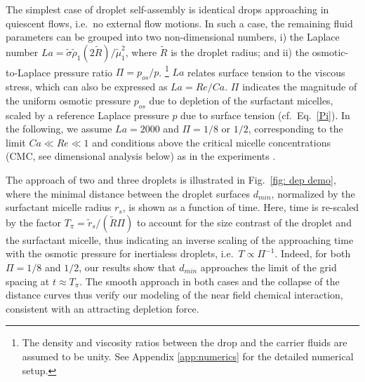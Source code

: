 The simplest case of droplet self-assembly is identical drops approaching in quiescent flows, i.e.\ no external flow motions. In such a case, the remaining fluid parameters can be grouped into two non-dimensional numbers, i) the Laplace number $La = \tilde{\sigma} \tilde{\rho}_1 (2\tilde{R})/\tilde{\mu}_1^2$, where $\tilde{R}$ is the droplet radius; and ii) the osmotic-to-Laplace pressure ratio $\Pi=p_{os}/p$. \footnote[3]{The density and viscosity ratios between the drop and the carrier fluids are assumed to be unity. See Appendix \ref{app:numerics} for the detailed numerical setup.} $La$ relates surface tension to the viscous stress, which can also be expressed as $La = Re/Ca$. $\Pi$ indicates the magnitude of the uniform osmotic pressure $p_{os}$ due to depletion of the surfactant micelles, scaled by a reference Laplace pressure $p$ due to surface tension (cf.\ Eq.\ \eqref{Pi}). In the following, we assume $La = 2000$ and $\Pi = 1/8$ or $1/2$, corresponding to the limit $Ca \ll Re \ll 1 $ and conditions above the critical micelle concentrations (CMC, see dimensional analysis below) as in the experiments \citep{Shen_2016AS}. 

The approach of two and three droplets is illustrated in Fig.\ \ref{fig: dep demo}, where the minimal distance between the droplet surfaces $d_{min}$, normalized by the surfactant micelle radius $r_s$, is shown as a function of time. Here, time is re-scaled by the factor $T_\pi = \tilde{r}_s/(\tilde{R}\Pi)$ to account for the size contrast of the droplet and the surfactant micelle, thus indicating an inverse scaling of the approaching time with the osmotic pressure for inertialess droplets, i.e.\ $T \propto \Pi^{-1}$. Indeed, for both $\Pi = 1/8$ and $1/2$, our results show that $d_{min}$ approaches the limit of the grid spacing at $t \approx T_\pi$. The smooth approach in both cases and the collapse of the distance curves thus verify our modeling of the near field chemical interaction, consistent with an attracting depletion force. 

